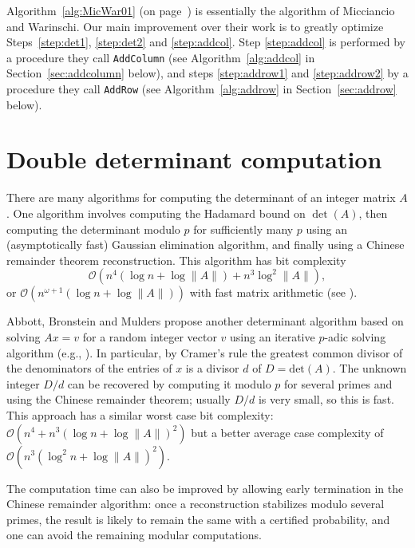 \documentclass[preprint,12pt]{elsarticle}
\newcommand{\GO}[1]{\ensuremath{\mathcal{O}\left(#1\right)}\xspace}
\theoremstyle{plain}
\theoremstyle{definition}
\numberwithin{equation}{section}
\numberwithin{figure}{section}
\numberwithin{table}{section}
\begin{document}
%
Algorithm~\ref{alg:MicWar01} (on page~\pageref{alg:hnf}) is essentially the algorithm of
Micciancio and Warinschi. 
Our main improvement over their work is to greatly optimize
Steps~\ref{step:det1}, \ref{step:det2} and \ref{step:addcol}.
Step \ref{step:addcol} is performed by a procedure
they call \texttt{AddColumn} (see Algorithm~\ref{alg:addcol} in Section~\ref{sec:addcolumn} below), 
and steps \ref{step:addrow1} and \ref{step:addrow2}
by a procedure they call \texttt{AddRow} (see Algorithm~\ref{alg:addrow} in Section~\ref{sec:addrow} below).


\section{Double determinant computation}
\label{sec:doubledet}

There are many algorithms for computing the determinant of an integer
matrix $A$.  One algorithm involves computing the Hadamard bound on
$\det(A)$, then computing the determinant modulo $p$ for sufficiently
many $p$ using an (asymptotically fast) Gaussian elimination
algorithm, and finally using a Chinese remainder theorem
reconstruction.  This algorithm has bit complexity
$$\GO{n^4(\log n +
  \log \|A\|) + n^3\log^2\|A\|},
$$ 
or 
\GO{n^{\omega+1}(\log n + \log
  \|A\|)} with fast matrix arithmetic (see \cite[Ch 5]{VonzurGathen:1999:MCA}).

Abbott, Bronstein and Mulders \cite{AbbBroMul99} propose another
determinant algorithm based on solving $A x = v$ for a random integer
vector $v$ using an iterative $p$-adic solving algorithm (e.g.,
\cite{Dix82, MoeCar79}).  In particular, by Cramer's rule the greatest
common divisor of the denominators of the entries of $x$ is a divisor
$d$ of $D=\text{det}(A)$.  The unknown integer $D/d$ can be recovered
by computing it modulo $p$ for several primes and using the Chinese
remainder theorem; usually $D/d$ is very small, so this is fast.  This
approach has a similar worst case bit complexity: \GO{n^4+n^3(\log n +
  \log\|A\|)^2} but a better average case complexity of 
\GO{n^3(\log^2 n + \log \|A\|)^2}.

The computation time can also be improved by allowing early
termination in the Chinese remainder algorithm: once a reconstruction
stabilizes modulo several primes, the result is likely to remain the
same with a certified probability, and one can avoid the remaining
modular computations.
\end{document}

